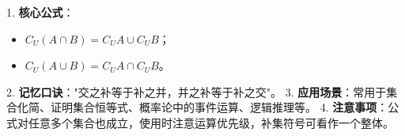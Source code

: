 \begin{summarybox}
1. \textbf{核心公式}：
   \begin{itemize}
       \item $C_U(A \cap B) = C_U A \cup C_U B$；
       \item $C_U(A \cup B) = C_U A \cap C_U B$。
   \end{itemize}
2. \textbf{记忆口诀}："交之补等于补之并，并之补等于补之交"。
3. \textbf{应用场景}：常用于集合化简、证明集合恒等式、概率论中的事件运算、逻辑推理等。
4. \textbf{注意事项}：公式对任意多个集合也成立，使用时注意运算优先级，补集符号可看作一个整体。
\end{summarybox}